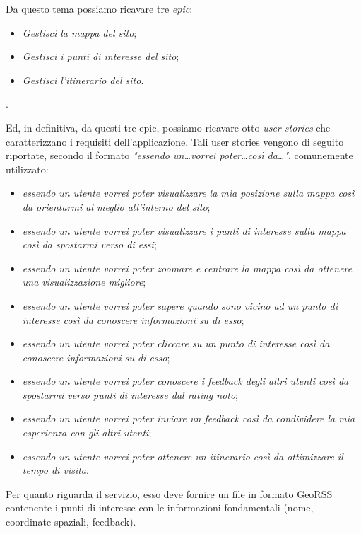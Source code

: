 Da questo tema possiamo ricavare tre \textit{epic}:
\begin{itemize}
\item \textit{Gestisci la mappa del sito};
\item \textit{Gestisci i punti di interesse del sito};
\item \textit{Gestisci l'itinerario del sito}.
\end{itemize}.

Ed, in definitiva, da questi tre epic, possiamo ricavare otto \textit{user stories} che caratterizzano i requisiti dell'applicazione. Tali user stories vengono di seguito riportate, secondo il formato \emph{"essendo un\dots vorrei poter\dots così da\dots"}, comunemente utilizzato:

\begin{itemize}
\item \textit{essendo un utente vorrei poter visualizzare la mia posizione sulla mappa così da orientarmi al meglio all'interno del sito};
\item \textit{essendo un utente vorrei poter visualizzare i punti di interesse sulla mappa così da spostarmi verso di essi};
\item \textit{essendo un utente vorrei poter zoomare e centrare la mappa così da ottenere una visualizzazione migliore};
\item \textit{essendo un utente vorrei poter sapere quando sono vicino ad un punto di interesse così da conoscere informazioni su di esso};
\item \textit{essendo un utente vorrei poter cliccare su un punto di interesse così da conoscere informazioni su di esso};
\item \textit{essendo un utente vorrei poter conoscere i feedback degli altri utenti così da spostarmi verso punti di interesse dal rating noto};
\item \textit{essendo un utente vorrei poter inviare un feedback così da condividere la mia esperienza con gli altri utenti};
\item \textit{essendo un utente vorrei poter ottenere un itinerario così da ottimizzare il tempo di visita}.
\end{itemize}


Per quanto riguarda il servizio, esso deve fornire un file in formato GeoRSS contenente i punti di interesse con le informazioni fondamentali (nome, coordinate spaziali, feedback).

